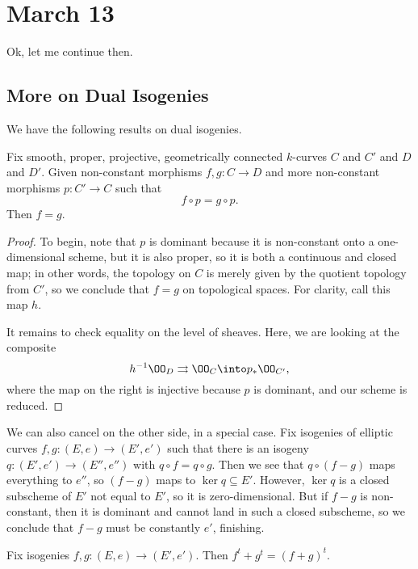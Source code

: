 \documentclass[../notes.tex]{subfiles}
\begin{document}
\section{March 13}

Ok, let me continue then.

\subsection{More on Dual Isogenies}
We have the following results on dual isogenies.
\begin{lemma} \label{lem:cancel-right}
	Fix smooth, proper, projective, geometrically connected $k$-curves $C$ and $C'$ and $D$ and $D'$. Given non-constant morphisms $f,g\colon C\to D$ and more non-constant morphisms $p\colon C'\to C$ such that
	\[f\circ p=g\circ p.\]
	Then $f=g$.
\end{lemma}
\begin{proof}
	To begin, note that $p$ is dominant because it is non-constant onto a one-dimensional scheme, but it is also proper, so it is both a continuous and closed map; in other words, the topology on $C$ is merely given by the quotient topology from $C'$, so we conclude that $f=g$ on topological spaces. For clarity, call this map $h$.

	It remains to check equality on the level of sheaves. Here, we are looking at the composite
	\[h^{-1}\OO_D\rightrightarrows\OO_C\into p_*\OO_{C'},\]
	where the map on the right is injective because $p$ is dominant, and our scheme is reduced.
\end{proof}
\begin{remark} \label{rem:cancel-left}
	We can also cancel on the other side, in a special case. Fix isogenies of elliptic curves $f,g\colon(E,e)\to(E',e')$ such that there is an isogeny $q\colon(E',e')\to(E'',e'')$ with $q\circ f=q\circ g$. Then we see that $q\circ(f-g)$ maps everything to $e''$, so $(f-g)$ maps to $\ker q\subseteq E'$. However, $\ker q$ is a closed subscheme of $E'$ not equal to $E'$, so it is zero-dimensional. But if $f-g$ is non-constant, then it is dominant and cannot land in such a closed subscheme, so we conclude that $f-g$ must be constantly $e'$, finishing.
\end{remark}
\begin{proposition} \label{lem:dual-add}
	Fix isogenies $f,g\colon(E,e)\to(E',e')$. Then $f^t+g^t=(f+g)^t$.
\end{proposition}
\end{document}
